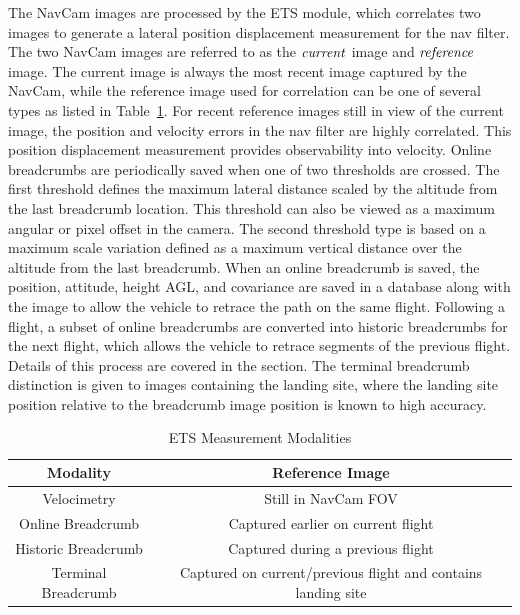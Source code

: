 \noindent The NavCam images are processed by the \ac{ETS} module, which correlates two images to generate a lateral position displacement measurement for the nav filter.\cite{witte2019no, jenkins2022} The two \ac{NavCam} images are referred to as the $\it{current}$ image and $\it{reference}$ image. The current image is always the most recent image captured by the \ac{NavCam}, while the reference image used for correlation can be one of several types as listed in Table~\ref{tab:ets_modalities}. For recent reference images still in view of the current image, the position and velocity errors in the nav filter are highly correlated.  This position displacement measurement provides observability into velocity. Online breadcrumbs are periodically saved when one of two thresholds are crossed. The first threshold defines the maximum lateral distance scaled by the altitude from the last breadcrumb location. This threshold can also be viewed as a maximum angular or pixel offset in the camera. The second threshold type is based on a maximum scale variation defined as a maximum vertical distance over the altitude from the last breadcrumb. When an online breadcrumb is saved, the position, attitude, height \ac{AGL}, and covariance are saved in a database along with the image to allow the vehicle to retrace the path on the same flight. Following a flight, a subset of online breadcrumbs are converted into historic breadcrumbs for the next flight, which allows the vehicle to retrace segments of the previous flight. Details of this process are covered in the  section. The terminal breadcrumb distinction is given to images containing the landing site, where the landing site position relative to the breadcrumb image position is known to high accuracy. 
\begin{table}[htbp]
	\fontsize{10}{10}\selectfont
    \caption{ETS Measurement Modalities}
   \label{tab:ets_modalities}
        \centering 
   \begin{tabular}{|c c|} %
      \hline 
      Modality & Reference Image  \\
      \hline 
      Velocimetry & Still in NavCam FOV \\
      Online Breadcrumb & Captured earlier on current flight  \\
      Historic Breadcrumb & Captured during a previous flight \\
      Terminal Breadcrumb & Captured on current/previous flight and contains landing site  \\
      \hline
   \end{tabular}
\end{table}
